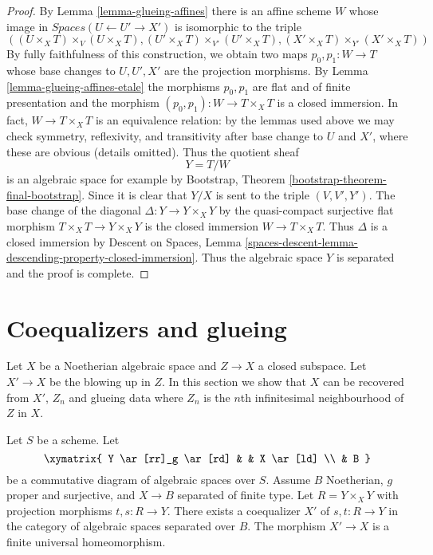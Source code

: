 \begin{proof}
\medskip\noindent
By Lemma \ref{lemma-glueing-affines} there is an affine scheme $W$ whose
image in $\textit{Spaces}(U \leftarrow U' \to X')$ is isomorphic to
the triple
$$
((U \times_X T) \times_V (U \times_X T),
(U' \times_X T) \times_{V'} (U' \times_X T),
(X' \times_X T) \times_{Y'} (X' \times_X T))
$$
By fully faithfulness of this construction, we obtain
two maps $p_0, p_1 : W \to T$ whose base changes
to $U, U', X'$ are the projection morphisms.
By Lemma \ref{lemma-glueing-affines-etale}
the morphisms $p_0, p_1$ are flat and of finite presentation and
the morphism $(p_0, p_1) : W \to T \times_X T$ is a closed immersion.
In fact, $W \to T \times_X T$ is an equivalence relation: by the lemmas
used above we may check symmetry, reflexivity, and transitivity
after base change to $U$ and $X'$, where these are obvious (details omitted).
Thus the quotient sheaf
$$
Y = T/W
$$
is an algebraic space for example by
Bootstrap, Theorem \ref{bootstrap-theorem-final-bootstrap}.
Since it is clear that $Y/X$ is sent to the triple $(V, V', Y')$.
The base change of the diagonal $\Delta : Y \to Y \times_X Y$
by the quasi-compact surjective flat morphism $T \times_X T \to Y \times_X Y$
is the closed immersion $W \to T \times_X T$. Thus $\Delta$
is a closed immersion by Descent on Spaces, Lemma
\ref{spaces-descent-lemma-descending-property-closed-immersion}.
Thus the algebraic space $Y$ is separated and the proof is complete.
\end{proof}








\section{Coequalizers and glueing}
\label{section-coequalizer-glue}

\noindent
Let $X$ be a Noetherian algebraic space and $Z \to X$ a closed subspace.
Let $X' \to X$ be the blowing up in $Z$. In this section we show that
$X$ can be recovered from $X'$, $Z_n$ and glueing data where $Z_n$
is the $n$th infinitesimal neighbourhood of $Z$ in $X$.

\begin{lemma}
\label{lemma-coequalizer}
Let $S$ be a scheme. Let
$$
\xymatrix{
Y \ar[rr]_g \ar[rd] & & X \ar[ld] \\
& B
}
$$
be a commutative diagram of algebraic spaces over $S$. Assume
$B$ Noetherian, $g$ proper and surjective, and $X \to B$ separated
of finite type. Let $R = Y \times_X Y$ with projection morphisms
$t, s : R \to Y$.  There exists a coequalizer $X'$ of $s, t : R \to Y$
in the category of algebraic spaces separated over $B$. The morphism
$X' \to X$ is a finite universal homeomorphism.
\end{lemma}

